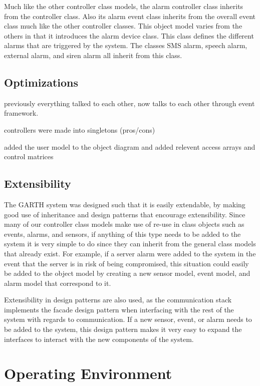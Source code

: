 \documentclass{report}
\begin{document}
Much like the other controller class models, the alarm controller class inherits
from the controller class. Also its alarm event class inherits from the overall
event class much like the other controller classes. This object model varies
from the others in that it introduces the alarm device class. This class defines
the different alarms that are triggered by the system. The classes SMS alarm,
speech alarm, external alarm, and siren alarm all inherit from this class.

\section{Optimizations}

previously everything talked to each other, now talks to each other through
event framework.

controllers were made into singletons (pros/cons)

added the user model to the object diagram and added relevent access arrays and
control matrices

\section{Extensibility}

The GARTH system was designed such that it is easily extendable, by making good
use of inheritance and design patterns that encourage extensibility. Since many
of our controller class models make use of re-use in class objects such as
events, alarms, and sensors, if anything of this type needs to be added to the
system it is very simple to do since they can inherit from the general class
models that already exist. For example, if a server alarm were added to the 
system in the event that the server is in risk of being compromised, this 
situation could easily be added to the object model by creating a new sensor
model, event model, and alarm model that correspond to it.

Extensibility in design patterns are also used, as the communication stack
implements the facade design pattern when interfacing with the rest of the
system with regards to communication. If a new sensor, event, or alarm needs to
be added to the system, this design pattern makes it very easy to expand the
interfaces to interact with the new components of the system.

\chapter{Operating Environment} %
\label{ch:operating-environment}
\end{document}
